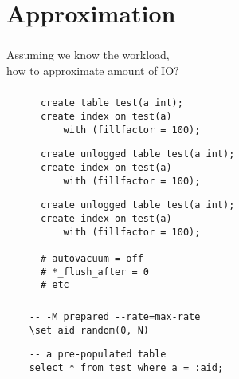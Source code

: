 \documentclass[usenames,dvipsnames, 18pt, compress, aspectratio=169]{beamer}
\begin{document}
\section{Approximation}

\begin{frame}[fragile]{}
    \frametitle{}

    Assuming we know the workload,\\
    how to approximate amount of IO?
\end{frame}

\begin{frame}[fragile]{}
    \frametitle{}

    \begin{overprint}[\textwidth]
        \begin{verbatim}
      create table test(a int);
      create index on test(a)
          with (fillfactor = 100);
        \end{verbatim}

        \begin{verbatim}
      create unlogged table test(a int);
      create index on test(a)
          with (fillfactor = 100);
        \end{verbatim}

        \begin{verbatim}
      create unlogged table test(a int);
      create index on test(a)
          with (fillfactor = 100);

      # autovacuum = off
      # *_flush_after = 0
      # etc
        \end{verbatim}

    \end{overprint}

\end{frame}

\begin{frame}[fragile]{}
    \frametitle{}

    \begin{verbatim}
    -- -M prepared --rate=max-rate
    \set aid random(0, N)
    \end{verbatim}

    \begin{verbatim}
    -- a pre-populated table
    select * from test where a = :aid;
    \end{verbatim}

\end{frame}
\end{document}
